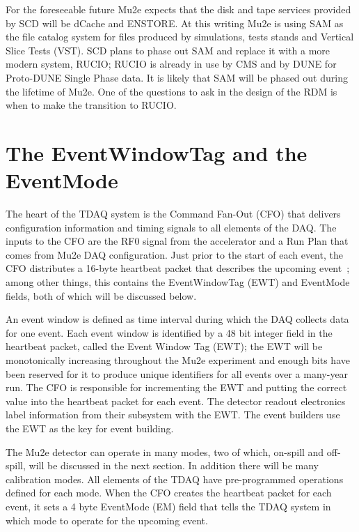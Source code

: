 For the foreseeable future Mu2e expects that the disk and tape services provided
by SCD will be dCache and ENSTORE.
At this writing Mu2e is using SAM as the file catalog system for files produced
by simulations, tests stands and Vertical Slice Tests (VST).
SCD plans to phase out SAM and replace it with a more modern system, RUCIO\cite{RUCIOHome};
RUCIO is already in use by CMS and by DUNE for Proto-DUNE Single Phase data.
It is likely that SAM will be phased out during the lifetime of Mu2e.
One of the questions to ask in the design of the RDM is
when to make the transition to RUCIO.

\section{The EventWindowTag and the EventMode}
\label{sec:EWTagAndEventMode}

The heart of the TDAQ system is the Command Fan-Out (CFO) that delivers
configuration information and timing signals to all elements of the DAQ.
The inputs to the CFO are the RF0 signal from the accelerator
and a Run Plan that comes from Mu2e DAQ configuration.
Just prior to the start of each event,
the CFO distributes a 16-byte heartbeat packet that describes the upcoming event~\cite{PacketProtocols};
among other things, this contains the EventWindowTag (EWT) and EventMode fields,
both of which will be discussed below.

An event window is defined as time interval during which the DAQ collects data for one event.
Each event window is identified by a 48 bit integer field in the heartbeat packet, called
the Event Window Tag (EWT);
the EWT will be monotonically increasing throughout the Mu2e experiment and
enough bits have been reserved for it to produce unique identifiers for all
events over a many-year run.
The CFO is responsible for incrementing the EWT and putting the correct value into
the heartbeat packet for each event.
The detector readout electronics label information from their subsystem with the EWT.
The event builders use the EWT as the key for event building.

The Mu2e detector can operate in many modes, two of which,
on-spill and off-spill, will be discussed in the next section.
In addition there will be many calibration modes.
All elements of the TDAQ have pre-programmed operations defined for each mode.
When the CFO creates the heartbeat packet for each event,
it sets a 4 byte EventMode (EM) field
that tells the TDAQ system in which mode to operate for the upcoming event.

